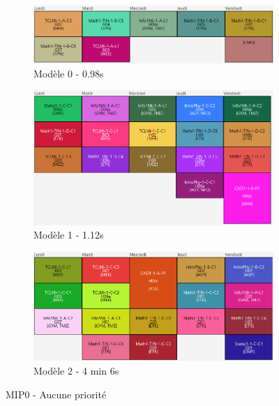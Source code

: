 \begin{figure}[H]
    \begin{subfigure}{0.3\linewidth}
        \centering
        \includegraphics[width=\linewidth]{./assets/figures/perfMIP0const0_0.98.png}
        \caption{Modèle 0 - 0.98s}
    \end{subfigure}
    \hfill
    \begin{subfigure}{0.3\linewidth}
        \centering
        \includegraphics[width=\linewidth]{./assets/figures/perfMIP0const1_1.12.png}
        \caption{Modèle 1 - 1.12s}
    \end{subfigure}
    \hfill
    \begin{subfigure}{0.3\linewidth}
        \centering
        \includegraphics[width=\linewidth]{./assets/figures/perfMIP0const2_246.png}
        \caption{Modèle 2 - 4 min 6s}
    \end{subfigure}
    \caption{MIP0 - Aucune priorité}
\end{figure}

